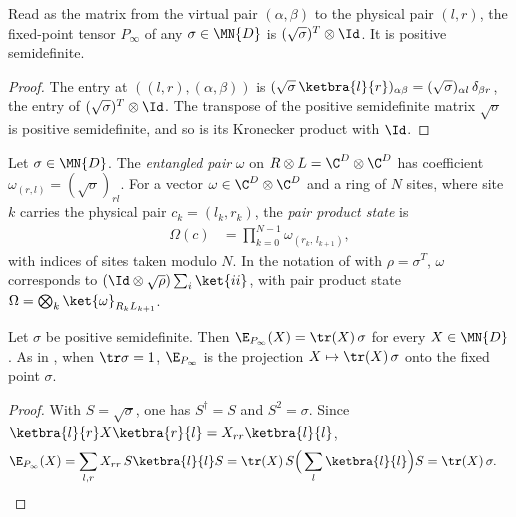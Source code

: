 \begin{lemma}
    \label{thm:prep_fixed_point_tensor_psd}
    \leanok
    Read as the matrix from the virtual pair $(\alpha,\beta)$ to the
    physical pair $(l,r)$, the fixed-point tensor $P_\infty$ of any
    $\sigma\in\MN{D}$ is $(\sqrt{\sigma})^T\otimes\Id$. It is positive
    semidefinite.
\end{lemma}
\begin{proof}
    \leanok
    The entry at $((l,r),(\alpha,\beta))$ is
    $(\sqrt\sigma\,\ketbra{l}{r})_{\alpha\beta}=(\sqrt\sigma)_{\alpha l}\,\delta_{\beta r}$,
    the entry of $(\sqrt\sigma)^T\otimes\Id$. The transpose of the
    positive semidefinite matrix $\sqrt\sigma$ is positive semidefinite,
    and so is its Kronecker product with $\Id$.
\end{proof}

\begin{definition}
    \label{def:prep_pair_product_state}
    \leanok
    Let $\sigma\in\MN{D}$. The \emph{entangled pair} $\omega$ on
    $R\otimes L=\C^D\otimes\C^D$ has coefficient
    $\omega_{(r,l)}=(\sqrt\sigma)_{rl}$. For a vector
    $\omega\in\C^D\otimes\C^D$ and a ring of $N$ sites, where site $k$
    carries the physical pair $c_k=(l_k,r_k)$, the \emph{pair product
        state} is
    \begin{align}
        \Omega(c)
         & =\prod_{k=0}^{N-1}\omega_{(r_k,\,l_{k+1})},
        \label{eq:prep_pair_product}
    \end{align}
    with indices of sites taken modulo $N$. In the notation of
    \cite{Malz2024Preparation} with $\rho=\sigma^T$, $\omega$ corresponds
    to $(\Id\otimes\sqrt\rho)\sum_i\ket{ii}$, with pair product state
    $\Omega=\bigotimes_k\ket{\omega}_{R_kL_{k+1}}$.
\end{definition}

\begin{lemma}
    \label{thm:prep_transfer_fixed_point_tensor}
    \leanok
    Let $\sigma$ be positive semidefinite. Then
    $\E_{P_\infty}(X)=\tr(X)\,\sigma$ for every $X\in\MN{D}$. As in
    \cite{Malz2024Preparation}, when $\tr\sigma=1$, $\E_{P_\infty}$ is the
    projection $X\mapsto\tr(X)\,\sigma$ onto the fixed point $\sigma$.
\end{lemma}
\begin{proof}
    \leanok
    With $S=\sqrt\sigma$, one has $S^\dagger=S$ and $S^2=\sigma$. Since
    $\ketbra{l}{r}X\ketbra{r}{l}=X_{rr}\ketbra{l}{l}$,
    \begin{align}
        \E_{P_\infty}(X)
         & =\sum_{l,r}X_{rr}\,S\ketbra{l}{l}S
        =\tr(X)\,S\Big(\sum_l\ketbra{l}{l}\Big)S
        =\tr(X)\,\sigma.
        \notag
    \end{align}
\end{proof}

